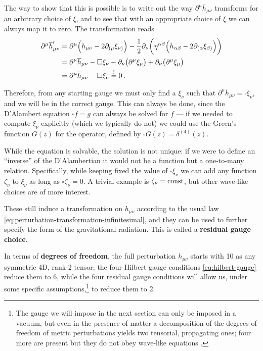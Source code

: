 \documentclass[main.tex]{subfiles}
\begin{document}
The way to show that this is possible is to write out the way \(\partial^{\mu } \overline{h}_{\mu \nu }\) transforms for an arbitrary choice of \(\xi \), and to see that with an appropriate choice of \(\xi \) we can always map it to zero. 
The transformation reads 
%
\begin{subequations}
\begin{align}
\partial^{\mu } \overline{h}_{\mu \nu }' &= 
\partial^{\mu } \qty(h_{\mu \nu } - 2 \partial_{(\mu } \xi_{\nu )}) - \frac{1}{2} \partial_{\nu } \qty(\eta^{\alpha \beta } \qty(h_{\alpha \beta } - 2 \partial_{(\alpha } \xi_{\beta )}))  \\
&= \partial^{\mu } \overline{h}_{\mu \nu } - \square \xi_{\nu } - \partial_{\nu } \qty(\partial^{\mu } \xi_{\mu }) + \partial_{\nu } \qty(\partial^{\mu } \xi_{\mu })  \\
&= \partial^{\mu } \overline{h}_{\mu \nu } - \square \xi_{\nu } \overset{!}{=} 0
\,. 
\end{align}
\end{subequations}

Therefore, from any starting gauge we must only find a \(\xi_{\nu }\) such that \(\partial^{\mu } \overline{h}_{\mu \nu } = \square \xi_{\nu }\), and we will be in the correct gauge. 
This can always be done, since the D'Alambert equation \(\square f = g\) can always be solved for \(f\) --- if we needed to compute \(\xi_{\nu }\) explicitly (which we typically do not) we could use the Green's function \(G(z)\) for the operator, defined by \(\square G(z) = \delta^{(4)} (z)\). 

While the equation is solvable, the solution is not unique: if we were to define an ``inverse'' of the D'Alambertian it would not be a function but a one-to-many relation. 
Specifically, while keeping fixed the value of \(\square \xi_{\nu }\) we can add any function \(\zeta_\nu \) to \(\xi _\nu  \) as long as \(\square \zeta _\nu = 0 \). 
A trivial example is \(\zeta _\nu = \mathrm{const}\), but other wave-like choices are of more interest. 

These still induce a transformation on \(h_{\mu \nu }\) according to the usual law \eqref{eq:perturbation-transformation-infinitesimal}, and they can be used to further specify the form of the gravitational radiation. This is called a \textbf{residual gauge choice}. 

In terms of \textbf{degrees of freedom}, the full perturbation \(h_{\mu \nu }\) starts with 10 as any symmetric 4D, rank-2 tensor; the four Hilbert gauge conditions \eqref{eq:hilbert-gauge} reduce them to 6, while the four residual gauge conditions will allow us, under some specific assumptions,\footnote{The gauge we will impose in the next section can only be imposed in a vacuum, but even in the presence of matter a decomposition of the degrees of freedom of metric perturbations yields two tensorial, propagating ones; four more are present but they do not obey wave-like equations \cite[sec.\ 7.2]{carrollSpacetimeGeometryIntroduction2019}.} to reduce them to 2.
\end{document}
